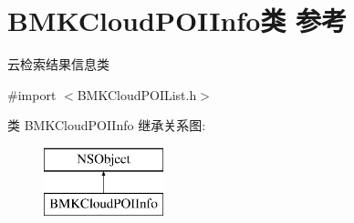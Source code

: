 \hypertarget{interface_b_m_k_cloud_p_o_i_info}{}\section{B\+M\+K\+Cloud\+P\+O\+I\+Info类 参考}
\label{interface_b_m_k_cloud_p_o_i_info}


云检索结果信息类  




{\ttfamily \#import $<$B\+M\+K\+Cloud\+P\+O\+I\+List.\+h$>$}

类 B\+M\+K\+Cloud\+P\+O\+I\+Info 继承关系图\+:\begin{figure}[H]
\begin{center}
\leavevmode
\includegraphics[height=2.000000cm]{interface_b_m_k_cloud_p_o_i_info}
\end{center}
\end{figure}
